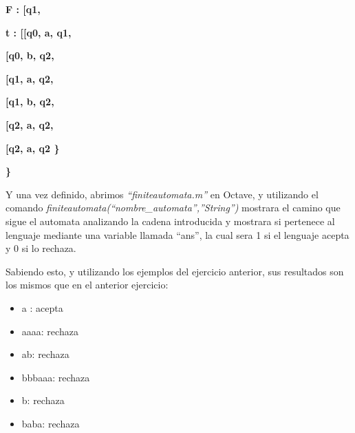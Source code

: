 \documentclass[english]{article}
\begin{document}
\textbf{\textquotedbl F\textquotedbl{} : {[}\textquotedbl q1\textquotedbl{]}, }

\textbf{\textquotedbl t\textquotedbl{} : {[}{[}\textquotedbl q0\textquotedbl ,
\textquotedbl a\textquotedbl , \textquotedbl q1\textquotedbl{]}, }

\textbf{{[}\textquotedbl q0\textquotedbl , \textquotedbl b\textquotedbl ,
\textquotedbl q2\textquotedbl{]}, }

\textbf{{[}\textquotedbl q1\textquotedbl , \textquotedbl a\textquotedbl ,
\textquotedbl q2\textquotedbl{]}, }

\textbf{{[}\textquotedbl q1\textquotedbl , \textquotedbl b\textquotedbl ,
\textquotedbl q2\textquotedbl{]}, }

\textbf{{[}\textquotedbl q2\textquotedbl , \textquotedbl a\textquotedbl ,
\textquotedbl q2\textquotedbl{]}, }

\textbf{{[}\textquotedbl q2\textquotedbl , \textquotedbl a\textquotedbl ,
\textquotedbl q2\textquotedbl{]}{]} \} }

\textbf{\}}

\noindent Y una vez definido, abrimos \textit{``finiteautomata.m''}
en Octave, y utilizando el comando\textit{ finiteautomata(``nombre\_automata'',''String'')}
mostrara el camino que sigue el automata analizando la cadena introducida
y mostrara si pertenece al lenguaje mediante una variable llamada
``ans'', la cual sera 1 si el lenguaje acepta y 0 si lo rechaza.

\noindent Sabiendo esto, y utilizando los ejemplos del ejercicio anterior,
sus resultados son los mismos que en el anterior ejercicio:
\begin{itemize}
\item a : acepta
\item aaaa: rechaza
\item ab: rechaza
\item bbbaaa: rechaza
\item b: rechaza
\item baba: rechaza
\end{itemize}
\end{document}
